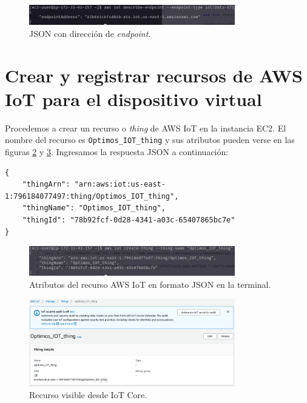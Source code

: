 \documentclass[10pt]{article}
\begin{document}
\begin{figure}[H]
    \centering
    \includegraphics[width=0.8\textwidth]{Images/Endpoint_json_terminal.png}
    \caption{JSON con dirección de \textit{endpoint}.}
    \label{fig:json_endpoint}
\end{figure}

\section{Crear y registrar recursos de AWS IoT para el dispositivo virtual}

Procedemos a crear un recurso o \textit{thing} de AWS IoT en la instancia EC2. El nombre del recurso es \texttt{Optimos\_IOT\_thing} y sus atributos pueden verse en las figuras \ref{fig:Atributos_objeto_AWS_IoT} y \ref{fig:AWS_IoT_core_thing}. Ingresamos la respuesta JSON a continuación:

\begin{lstlisting}
{
    "thingArn": "arn:aws:iot:us-east-1:796184077497:thing/Optimos_IOT_thing",
    "thingName": "Optimos_IOT_thing",
    "thingId": "78b92fcf-0d28-4341-a03c-65407865bc7e"
}
\end{lstlisting}

\begin{figure}[H]
    \centering
    \includegraphics[width=0.8\textwidth]{Images/IOT_object_JSON_terminal.png}
    \caption{Atributos del recurso AWS IoT en formato JSON en la terminal.}
    \label{fig:Atributos_objeto_AWS_IoT}
\end{figure}

\begin{figure}[H]
    \centering
    \includegraphics[width=0.8\textwidth]{Images/AWS_console_IOT_object.png}
    \caption{Recurso visible desde IoT Core.}
    \label{fig:AWS_IoT_core_thing}
\end{figure}
\end{document}
